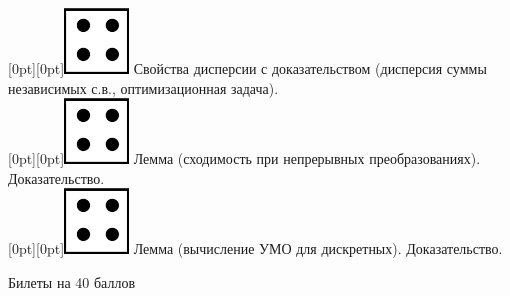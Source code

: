 \documentclass[10pt]{article}
\begin{document}
\raisebox{-1pt}[0pt][0pt]{\includegraphics[width=0.02\linewidth]{4.png}} Свойства дисперсии с доказательством (дисперсия суммы независимых с.в., оптимизационная задача). \\ 
\raisebox{-1pt}[0pt][0pt]{\includegraphics[width=0.02\linewidth]{4.png}} Лемма  (сходимость при непрерывных преобразованиях). Доказательство. \\
\raisebox{-1pt}[0pt][0pt]{\includegraphics[width=0.02\linewidth]{4.png}} Лемма (вычисление УМО для дискретных). Доказательство. \\


\begin{center}
    Билеты на 40 баллов
\end{center}
\end{document}
